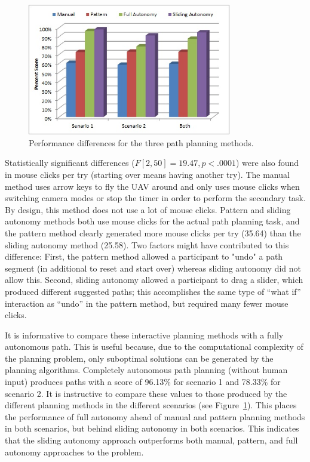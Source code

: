 \documentclass[lettersize, apacite, twoside, HRI]{apa_HRI}
\begin{document}
\begin{figure}
\centering
\includegraphics[width=3.5in]{PerformanceDifference.JPG}
\caption{Performance differences for the three path planning methods.}
\label{PerformanceDifference}
\end{figure}

Statistically significant differences ($F[2,50]=19.47, p<.0001$) were also found in mouse clicks per try (starting over means having another try). The manual method uses arrow keys to fly the UAV around and only uses mouse clicks when switching camera modes or stop the timer in order to perform the secondary task. By design, this method does not use a lot of mouse clicks. Pattern and sliding autonomy methods both use mouse clicks for the actual path planning task, and the pattern method clearly generated more mouse clicks per try (35.64) than the sliding autonomy method (25.58). Two factors might have contributed to this difference: First, the pattern method allowed a participant to "undo" a path segment (in additional to reset and start over) whereas sliding autonomy did not allow this. Second, sliding autonomy allowed a participant to drag a slider, which produced different suggested paths; this accomplishes the same type of ``what if'' interaction as ``undo'' in the pattern method, but required many fewer mouse clicks.

It is informative to compare these interactive planning methods with a fully autonomous path. This is useful because, due to the computational complexity of the planning problem, only suboptimal solutions can be generated by the planning algorithms. Completely autonomous path planning (without human input) produces paths with a score of 96.13\% for scenario 1 and 78.33\% for scenario 2. It is instructive to compare these values to those produced by the different planning methods in the different scenarios (see Figure~\ref{PerformanceDifference}). This places the performance of full autonomy ahead of manual and pattern planning methods in both scenarios, but behind sliding autonomy in both scenarios. This indicates that the sliding autonomy approach outperforms both manual, pattern, and full autonomy approaches to the problem.
\end{document}
